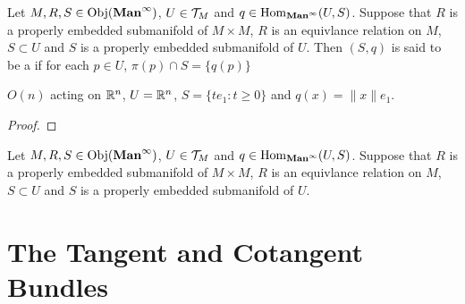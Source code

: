 \documentclass{book}
\begin{document}
\begin{defn}
	Let $M, R, S \in \operatorname{Obj}(\operatorname*{\text{\textbf{Man}}^{\infty}})$, $U \in \mathcal{T}_M$ and $q \in \operatorname{Hom}_{\operatorname*{\text{\textbf{Man}}^{\infty}}}(U, S)$. Suppose that $R$ is a properly embedded submanifold of $M \times M$, $R$ is an equivlance relation on $M$, $S \subset U$ and $S$ is a properly embedded submanifold of $U$. Then $(S, q)$ is said to be a  if for each $p \in U$, $\pi(p) \cap S = \{q(p)\}$
\end{defn}

\begin{ex}
	$O(n)$ acting on $\mathbb{R}^n$, $U = \mathbb{R}^n$, $S = \{te_1:t \geq 0\}$ and $q(x) = \|x\|e_1$.
\end{ex}

\begin{proof}
	
\end{proof}



\begin{ex} 
	Let $M, R, S \in \operatorname{Obj}(\operatorname*{\text{\textbf{Man}}^{\infty}})$, $U \in \mathcal{T}_M$ and $q \in \operatorname{Hom}_{\operatorname*{\text{\textbf{Man}}^{\infty}}}(U, S)$. Suppose that $R$ is a properly embedded submanifold of $M \times M$, $R$ is an equivlance relation on $M$, $S \subset U$ and $S$ is a properly embedded submanifold of $U$. 
\end{ex}

























































\newpage
\chapter{The Tangent and Cotangent Bundles}
\end{document}
